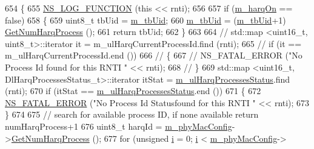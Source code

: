 \begin{DoxyCode}
654 \{
655         \hyperlink{log-macros-disabled_8h_a90b90d5bad1f39cb1b64923ea94c0761}{NS\_LOG\_FUNCTION} (\textcolor{keyword}{this} << rnti);
656 
657         \textcolor{keywordflow}{if} (\hyperlink{classns3_1_1MmWaveFlexTtiPfMacScheduler_ab7edfa7baaf0e2ce6c2ba43efc59e291}{m\_harqOn} == \textcolor{keyword}{false})
658         \{
659                 uint8\_t tbUid = \hyperlink{classns3_1_1MmWaveFlexTtiPfMacScheduler_ad67ede1dc070d024283a2fcd765fded9}{m\_tbUid};
660                 \hyperlink{classns3_1_1MmWaveFlexTtiPfMacScheduler_ad67ede1dc070d024283a2fcd765fded9}{m\_tbUid} = (\hyperlink{classns3_1_1MmWaveFlexTtiPfMacScheduler_ad67ede1dc070d024283a2fcd765fded9}{m\_tbUid}+1) %
      \hyperlink{classns3_1_1MmWavePhyMacCommon_a40773d84172ebeb5aff125f56ebcc5ac}{GetNumHarqProcess} ();
661                 \textcolor{keywordflow}{return} tbUid;
662         \}
663 
664 \textcolor{comment}{//      std::map <uint16\_t, uint8\_t>::iterator it = m\_ulHarqCurrentProcessId.find (rnti);}
665 \textcolor{comment}{//      if (it == m\_ulHarqCurrentProcessId.end ())}
666 \textcolor{comment}{//      \{}
667 \textcolor{comment}{//              NS\_FATAL\_ERROR ("No Process Id found for this RNTI " << rnti);}
668 \textcolor{comment}{//      \}}
669         std::map <uint16\_t, DlHarqProcessesStatus\_t>::iterator itStat = 
      \hyperlink{classns3_1_1MmWaveFlexTtiPfMacScheduler_aee0051900f7d928d25d577ad83983bf4}{m\_ulHarqProcessesStatus}.find (rnti);
670         \textcolor{keywordflow}{if} (itStat == \hyperlink{classns3_1_1MmWaveFlexTtiPfMacScheduler_aee0051900f7d928d25d577ad83983bf4}{m\_ulHarqProcessesStatus}.end ())
671         \{
672                 \hyperlink{group__fatal_ga5131d5e3f75d7d4cbfd706ac456fdc85}{NS\_FATAL\_ERROR} (\textcolor{stringliteral}{"No Process Id Statusfound for this RNTI "} << rnti);
673         \}
674 
675         \textcolor{comment}{// search for available process ID, if none available return numHarqProcess+1}
676         uint8\_t harqId = \hyperlink{classns3_1_1MmWaveMacScheduler_a24d7af4971d2e500fe543cefbafa2fd9}{m\_phyMacConfig}->\hyperlink{classns3_1_1MmWavePhyMacCommon_a40773d84172ebeb5aff125f56ebcc5ac}{GetNumHarqProcess} ();
677         \textcolor{keywordflow}{for} (\textcolor{keywordtype}{unsigned} \hyperlink{bernuolliDistribution_8m_a6f6ccfcf58b31cb6412107d9d5281426}{i} = 0; \hyperlink{bernuolliDistribution_8m_a6f6ccfcf58b31cb6412107d9d5281426}{i} < \hyperlink{classns3_1_1MmWaveMacScheduler_a24d7af4971d2e500fe543cefbafa2fd9}{m\_phyMacConfig}->

\end{DoxyCode}
